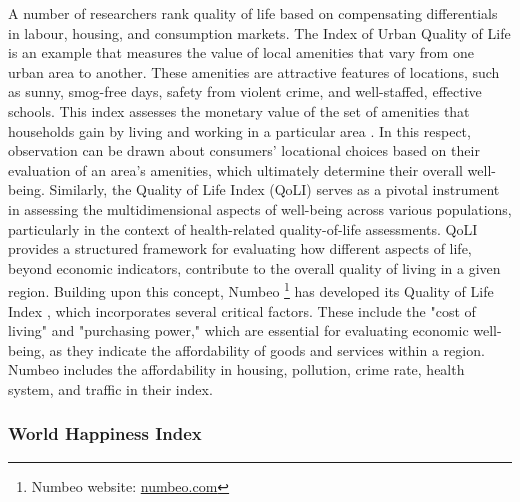 A number of researchers rank quality of life based on compensating differentials in labour, housing, and consumption markets. The Index of Urban Quality of Life is an example that measures the value of local amenities that vary from one urban area to another. These amenities are attractive features of locations, such as sunny, smog-free days, safety from violent crime, and well-staffed, effective schools. This index assesses the monetary value of the set of amenities that households gain by living and working in a particular area \cite{rosen1979wage}. In this respect, observation can be drawn about consumers' locational choices based on their evaluation of an area's amenities, which ultimately determine their overall well-being. Similarly, the Quality of Life Index (QoLI) %
serves as a pivotal instrument in assessing the multidimensional aspects of well-being across various populations, particularly in the context of health-related quality-of-life assessments. QoLI provides a structured framework for evaluating how different aspects of life, beyond economic indicators, contribute to the overall quality of living in a given region. Building upon this concept, Numbeo \footnote{Numbeo website: \url{numbeo.com}} has developed its Quality of Life Index \cite{numbeo_qol}, which incorporates several critical factors. These include the "cost of living" and "purchasing power," which are essential for evaluating economic well-being, as they indicate the affordability of goods and services within a region. Numbeo includes the affordability in housing, pollution, crime rate, health system, and traffic in their index. 
 
\subsubsection{World Happiness Index}

